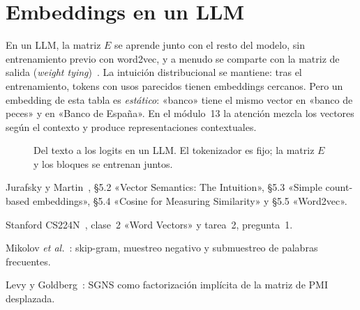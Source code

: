 \section{Embeddings en un LLM}

En un LLM, la matriz $E$ se aprende junto con el resto del modelo, sin entrenamiento previo con word2vec, y a menudo se comparte con la matriz de salida (\emph{weight tying})~\cite[§14.2.3]{jm3}. La intuición distribucional se mantiene: tras el entrenamiento, tokens con usos parecidos tienen embeddings cercanos. Pero un embedding de esta tabla es \emph{estático}: «banco» tiene el mismo vector en «banco de peces» y en «Banco de España». En el módulo~13 la atención mezcla los vectores según el contexto y produce representaciones contextuales.

\begin{figure}[h]
\centering
{}
\caption{Del texto a los logits en un LLM. El tokenizador es fijo; la matriz $E$ y los bloques se entrenan juntos.}
\label{fig:tubo}
\end{figure}

\begin{lecturas}
\item Jurafsky y Martin~\cite{jm3}, §5.2 «Vector Semantics: The Intuition», §5.3 «Simple count-based embeddings», §5.4 «Cosine for Measuring Similarity» y §5.5 «Word2vec».
\item Stanford CS224N~\cite{cs224n}, clase~2 «Word Vectors» y tarea~2, pregunta~1.
\item Mikolov \emph{et al.}~\cite{mikolov13a,mikolov13b}: skip-gram, muestreo negativo y submuestreo de palabras frecuentes.
\item Levy y Goldberg~\cite{levy}: SGNS como factorización implícita de la matriz de PMI desplazada.
\end{lecturas}

